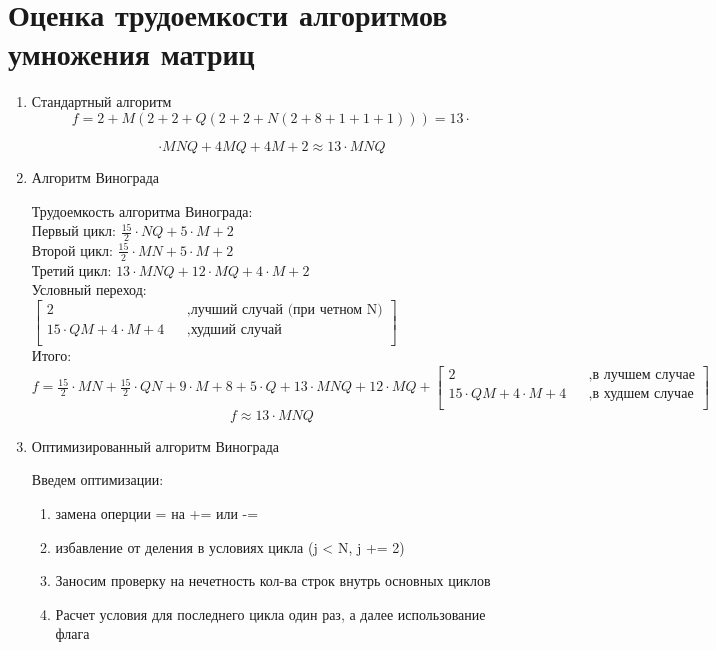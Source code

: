 \documentclass[12pt]{report}
\begin{document}
\section{Оценка трудоемкости алгоритмов умножения матриц}
\hfill
\begin{enumerate}
	\item Стандартный алгоритм
	$$f=2+M(2+2+Q(2+2+N(2+8+1+1+1)))=13 \cdot$$
	
	$$\cdot MNQ+4MQ+4M+2 \approx 13 \cdot MNQ$$ 
	
	\item Алгоритм Винограда
	
	Трудоемкость алгоритма Винограда:\\
	
	Первый цикл: $\frac{15}{2} \cdot N  Q + 5 \cdot M + 2$ \\
	
	Второй цикл: $\frac{15}{2} \cdot M  N + 5 \cdot M + 2$\\
	
	Третий цикл: $13 \cdot M  N Q + 12 \cdot M Q + 4 \cdot M + 2$\\
	
	Условный переход: $\begin{bmatrix}
		2    &&, \text{лучший случай (при четном N)}\\
		15 \cdot QM + 4 \cdot M + 4 &&, \text{худший случай}\\
	\end{bmatrix} $ \\
	
	Итого: $f = \frac{15}{2} \cdot M  N + \frac{15}{2} \cdot Q  N + 9 \cdot M + 8 +  5 \cdot Q + 13 \cdot M  N Q + 12 \cdot M Q +
	\begin{bmatrix}
		2    &&, \text{в лучшем случае}\\
		15 \cdot QM + 4 \cdot M + 4 &&, \text{в худшем случае}\\
	\end{bmatrix} $ \\
	
	$$f \approx 13 \cdot MNQ $$
	
	\item Оптимизированный алгоритм Винограда
	
	Введем оптимизации: 
	\begin{enumerate}
		\item замена оперции = на += или -=
		\item избавление от деления в условиях цикла (j < N, j += 2)
		\item Заносим проверку на нечетность кол-ва строк внутрь основных циклов
		\item Расчет условия для последнего цикла один раз, а далее использование флага
	\end{enumerate}
	

\end{enumerate}
\end{document}
